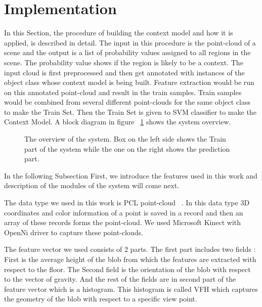 \section{Implementation}
\label{Implementation.sec}

In this Section, the procedure of building the context model and how it is applied, is described in detail. 
The input in this procedure is the point-cloud of a scene and the output is a list of probability values assigned to all regions in
the scene. 
The probability value shows if the region is likely to be a context. 
The input cloud is first preprocessed and then get annotated with instances of the object class whose context model is being built. 
Feature extraction would be run on this annotated point-cloud and result in the train samples. 
Train samples would be combined from several different point-clouds for the same object class to make the Train Set. 
Then the Train Set is given to SVM classifier to make the Context Model. A block diagram in figure ~\ref{SystemOverview.figure} shows 
the system overview.

\begin{figure}[t]
  \caption[System Overview]
  {The overview of the system. Box on the left side shows the Train part of the system while the one on the right shows the prediction part.}
  \label{SystemOverview.figure}
\end{figure}

In the following Subsection First, we introduce the features used in this work and description of the modules of the system 
will come next.

The data type we used in this work is PCL point-cloud ~\cite{Rusu_ICRA2011_PCL}. 
In this data type 3D coordinates and color information of a point is saved in a record and then an array of these records forms 
the point-cloud.
We used Microsoft Kinect with OpenNi driver to capture these point-clouds. 


The feature vector we used consists of 2 parts. 
The first part includes two fields : First is the average height of the blob from which the features are extracted with respect to
the floor. 
The Second field is the orientation of the blob with respect to the vector of gravity. 
And the rest of the fields are in second part of the feature vector which is a histogram.
This histogram is called VFH which captures the geometry of the blob with respect to a specific view point. ~\cite{5651280}

